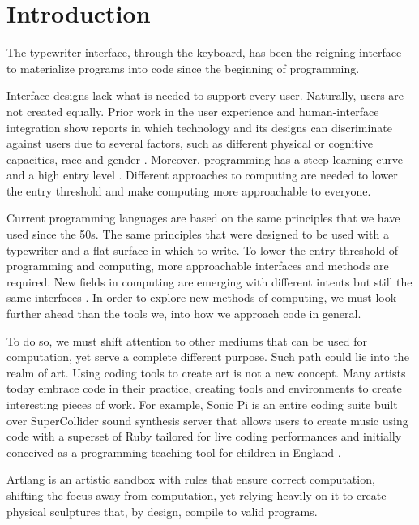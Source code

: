
\chapter{Introduction}
\label{cha:introduction}
The typewriter interface, through the keyboard, has been the reigning interface to materialize programs into code since the beginning of programming.

Interface designs lack what is needed to support every user. Naturally, users are not created equally.
Prior work in the user experience and human-interface integration show reports in which technology and its designs can discriminate against users due to several factors,
such as different physical or cognitive capacities, race and gender \cite{ko23}.
Moreover, programming has a steep learning curve and a high entry level \cite{bosse17}.
Different approaches to computing are needed to lower the entry threshold and make computing more approachable to everyone.

Current programming languages are based on the same principles that we have used since the 50s.
The same principles that were designed to be used with a typewriter and a flat surface in which to write.
To lower the entry threshold of programming and computing, more approachable interfaces and methods are required.
New fields in computing are emerging with different intents but still the same interfaces \cite{hongji16}.
In order to explore new methods of computing, we must look further ahead than the tools we, into how we approach code in general.

To do so, we must shift attention to other mediums that can be used for computation, yet serve a complete different purpose.
Such path could lie into the realm of art. Using coding tools to create art is not a new concept.
Many artists today embrace code in their practice, creating tools and environments to create interesting pieces of work. 
For example, Sonic Pi is an entire coding suite built over SuperCollider sound synthesis server that allows users to create music using code with a superset of Ruby 
tailored for live coding performances and initially conceived as a programming teaching tool for children in England \cite{aaron16}.

Artlang is an artistic sandbox with rules that ensure correct computation, shifting the focus away from computation, yet relying heavily on it to create physical sculptures that, by design, compile to valid programs.



\endinput

